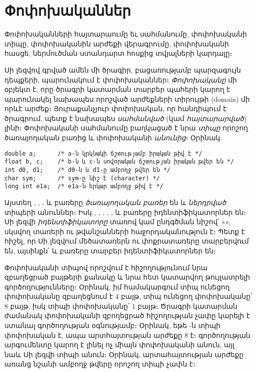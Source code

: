 \chapter{Փոփոխականներ}
\label{cha:variables}

\begin{epigraph}
Փոփոխականների հայտարաումը եւ սահմանումը, փոփոխականի
տիպը, փոփոխականին արժեքի վերագրումը, փոփոխականի հասցե,
ներմուծման ստանդարտ հոսքից տվյալների կարդալը։
\end{epigraph}

Սի լեզվով գրված ամեն մի ծրագիր, բացառությամբ պարզագույն դեպքերի,
պարունակում է փոփոխականներ։ \emph{Փոփոխականը}
մի օբյեկտ է, որը ծրագրի կատարման տարբեր պահերի կարող է պարունակել
նախապես որոշված ար\-ժեքների տիրույթի (domain) մի որևէ արժեք։
Յուրաքանչյուր փոփոխական, որ հանդիպում է ծրագրում, պետք է նախապես
\emph{սահմանված} (կամ \emph{հայտարարված})
լինի։ Փոփոխականի սահմանումը բաղկացած է նրա \emph{տիպը}
որոշող ծառայողական բառից և փոփո\-խականի \emph{անունից}։
 Օրինակ.

\begin{Verbatim}
double a;      /* a-ն կրկնակի ճշտությամբ իրական թիվ է */
float b, c;    /* b-ն և c-ն սովորական ճշտության իրական թվեր են */
int d0, d1;    /* d0-ն և d1-ը ամբողջ թվեր են */
char sym;      /* sym-ը նիշ է (character) */
long int e1a;  /* e1a-ն երկար ամբողջ թիվ է */
\end{Verbatim}

Այստեղ , , ,  և
 բառերը \emph{ծառայողական բառեր} են և \emph{ներդրված}
տիպերի անուններ։ Իսկ , , , ,
,  և  բառերը իդենտիֆիկատորներ են։
Սի լեզվի \emph{իդենտիֆիկատորը} տառով կամ ընդգծման նիշով՝
«\code{\_}», սկսվող տառերի ու թվանշանների հաջորդականություն է։
Պետք է հիշել, որ Սի լեզվում մեծատառերն ու փոքրատառերը տարբերվում
են, այսինքն՝  և  բառերը տարբեր
իդենտիֆիկատորներ են։

Փոփոխականի տիպով որոշվում է հիշողությունում նրա զբաղեցրած բայթերի
քանակը և նրա հետ կատարվող թույլատրելի գործողությունները։ Օրինակ, իմ
համակարգում  տիպ ունեցող փոփոխականը զբաղեցնում է 4 բայթ,
 տիպ ունեցող փոփոխականը՝ 8 բայթ, իսկ  տիպի
փոփոխականը՝ 1 բայթ։ Ծրագրի կատարման ժամանակ փոփոխականի զբողեցրած
հիշողության չափը կարելի է ստանալ  գործողության օգնությամբ։
Օրինակ, եթե -ն  տիպի փոփոխական է, ապա
 արտհայտության արժեքը 8 է։ 
գործողության արգումենտը կարող է լինել ոչ միայն փոփոխականի անուն,
այլ նաև Սի լեզվի տիպի անուն։ Օրինակ, 
արտահայտութ\-յան արժեքը առանց նշանի ամբողջ թվերը որոշող տիպի չափն է։

